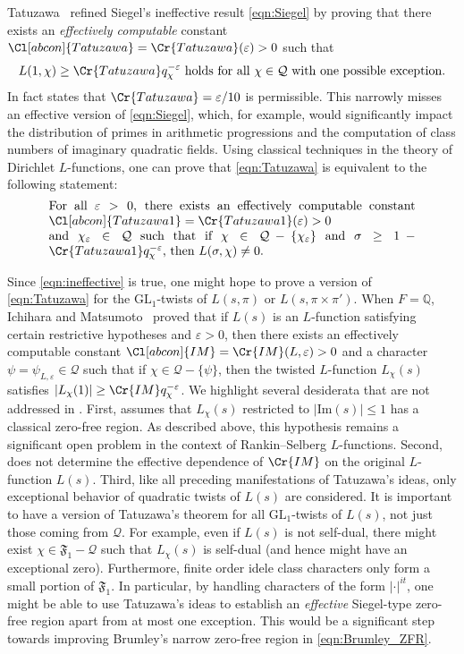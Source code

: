 \documentclass[12pt]{amsart}
\theoremstyle{definition}
\theoremstyle{remark}
\numberwithin{equation}{section}
\theoremstyle{plain}
\renewcommand{\epsilon}{\varepsilon}
\renewcommand{\Im}{\mathrm{Im}}
\newcommand{\im}{\Im}
\newcommand{\GL}{\mathrm{GL}}
\newcommand{\Q}{\mathbb{Q}}
\begin{document}
Tatuzawa~\cite{Tatuzawa} refined Siegel's ineffective result \eqref{eqn:Siegel} by proving that there exists an {\it effectively computable} constant $\Cl[abcon]{Tatuzawa}=\Cr{Tatuzawa}(\epsilon)>0$ such that
\begin{equation}
\label{eqn:Tatuzawa}
\text{$L(1,\chi)\geq \Cr{Tatuzawa} q_{\chi}^{-\epsilon}$ holds for all $\chi\in\mathcal{Q}$ with one possible exception.}
\end{equation}
In fact \cite[Theorem~1]{Tatuzawa} states that $\Cr{Tatuzawa}=\epsilon/10$ is permissible.  This narrowly misses an effective version of \eqref{eqn:Siegel}, which, for example, would significantly impact the distribution of primes in arithmetic progressions and the computation of class numbers of imaginary quadratic fields.  Using classical techniques in the theory of Dirichlet $L$-functions, one can prove that \eqref{eqn:Tatuzawa} is equivalent to the following statement:
\begin{equation}
\label{eqn:Tatuzawa_ZFR}
\parbox{0.85\linewidth}{For all $\epsilon>0$, there exists an effectively
computable constant
$\Cl[abcon]{Tatuzawa1}=\Cr{Tatuzawa1}(\epsilon)>0$\\and
$\chi_{\epsilon}\in\mathcal{Q}$ such that if
$\chi\in\mathcal{Q}-\{\chi_{\epsilon}\}$ and $\sigma\geq
1-\Cr{Tatuzawa1}q_{\chi}^{-\epsilon}$, then $L(\sigma,\chi)\neq 0$.}
\end{equation}

Since \eqref{eqn:ineffective} is true, one might hope to prove a version of \eqref{eqn:Tatuzawa} for the $\GL_1$-twists of $L(s,\pi)$ or $L(s,\pi\times\pi')$.  When $F=\Q$, Ichihara and Matsumoto~\cite{IM} proved that if $L(s)$ is an $L$-function satisfying certain restrictive hypotheses and $\epsilon>0$, then there exists an effectively computable constant $\Cl[abcon]{IM}=\Cr{IM}(L,\epsilon)>0$ and a character $\psi=\psi_{L,\epsilon}\in\mathcal{Q}$ such that if $\chi\in\mathcal{Q}-\{\psi\}$, then the twisted $L$-function $L_{\chi}(s)$ satisfies $|L_{\chi}(1)|\geq \Cr{IM}q_{\chi}^{-\epsilon}$. We highlight several desiderata that are not addressed in \cite{IM}.  First, \cite{IM} assumes that $L_{\chi}(s)$ restricted to $|\im(s)|\leq 1$ has a classical zero-free region.  As described above, this hypothesis remains a significant open problem in the context of Rankin--Selberg $L$-functions. Second, \cite{IM} does not determine the effective dependence of $\Cr{IM}$ on the original $L$-function $L(s)$.  Third, like all preceding manifestations of Tatuzawa's ideas, only exceptional behavior of quadratic twists of $L(s)$ are considered.  It is important to have a version of Tatuzawa's theorem for all $\GL_1$-twists of $L(s)$, not just those coming from $\mathcal{Q}$. For example, even if $L(s)$ is not self-dual, there might exist $\chi\in\mathfrak{F}_1-\mathcal{Q}$ such that $L_{\chi}(s)$ is self-dual (and hence might have an exceptional zero). Furthermore, finite order idele class characters only form a small portion of $\mathfrak{F}_1$. In particular, by handling characters of the form $|\cdot|^{it}$, one might be able to use Tatuzawa's ideas to establish an {\it effective} Siegel-type zero-free region apart from at most one exception.  This would be a significant step towards improving Brumley's narrow zero-free region in \eqref{eqn:Brumley_ZFR}.
\end{document}
